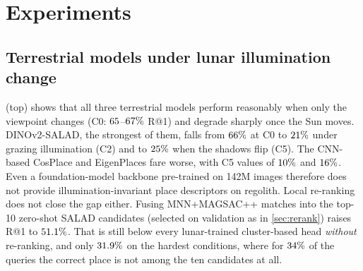 \section{Experiments}\label{sec:exp}





\subsection{Terrestrial models under lunar illumination change}\label{sec:zeroshot}
 (top) shows that all three terrestrial models perform reasonably when only the
viewpoint changes (C0: $65$--$67\%$ R@1) and degrade sharply once the Sun moves.
DINOv2-SALAD, the strongest of them, falls from $66\%$ at C0 to
$21\%$ under grazing illumination (C2) and to $25\%$ when the shadows flip (C5).
The CNN-based CosPlace and EigenPlaces fare worse, with C5 values of $10\%$ and $16\%$.
Even a foundation-model backbone pre-trained on 142M images therefore does not provide
illumination-invariant place descriptors on regolith. Local re-ranking does not close the gap
either. Fusing MNN+MAGSAC++ matches into the top-10 zero-shot SALAD candidates (selected on
validation as in \cref{sec:rerank}) raises R@1 to $51.1\%$. That is still below every
lunar-trained cluster-based head \emph{without} re-ranking, and only $31.9\%$ on the hardest
conditions, where for $34\%$ of the queries the correct place is not among the ten candidates
at all.







